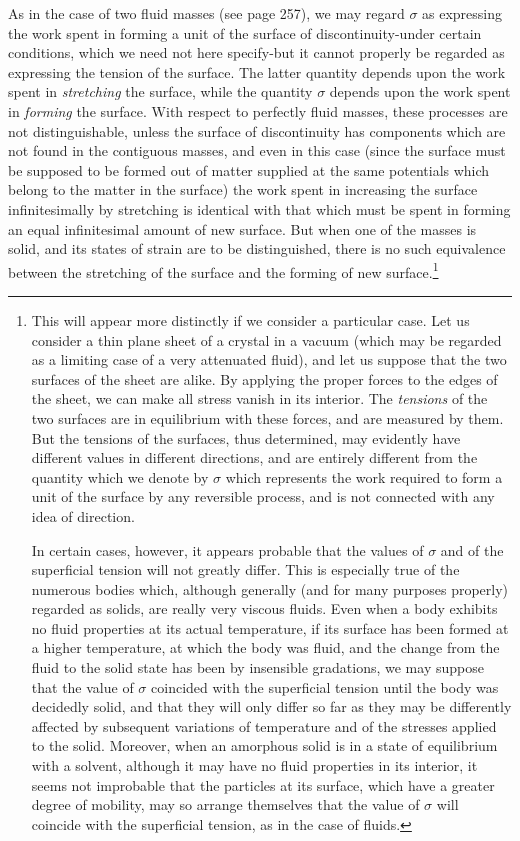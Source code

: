 \documentclass[12pt]{article}
\begin{document}
As in the case of two fluid masses (see page 257), we may regard $\sigma$ as expressing the work spent in forming a unit of the surface of discontinuity-under certain conditions, which we need not here specify-but it cannot properly be regarded as expressing the tension of the surface. The latter quantity depends upon the work spent in \textit{stretching} the surface, while the quantity $\sigma$ depends upon the work spent in \textit{forming} the surface. With respect to perfectly fluid masses, these processes are not distinguishable, unless the surface of discontinuity has components which are not found in the contiguous masses, and even in this case (since the surface must be supposed to be formed out of matter supplied at the same potentials which belong to the matter in the surface) the work spent in increasing the surface infinitesimally by stretching is identical with that which must be spent in forming an equal infinitesimal amount of new surface. But when one of the masses is solid, and its states of strain are to be distinguished, there is no such equivalence between the stretching of the surface and the forming of new surface.\footnote{This will appear more distinctly if we consider a particular case. Let us consider a thin plane sheet of a crystal in a vacuum (which may be regarded as a limiting case of a very attenuated fluid), and let us suppose that the two surfaces of the sheet are alike. By applying the proper forces to the edges of the sheet, we can make all stress vanish in its interior. The \textit{tensions} of the two surfaces are in equilibrium with these forces, and are measured by them. But the tensions of the surfaces, thus determined, may evidently have different values in different directions, and are entirely different from the quantity which we denote by $\sigma$ which represents the work required to form a unit of the surface by any reversible process, and is not connected with any idea of direction. \par
In certain cases, however, it appears probable that the values of $\sigma$ and of the superficial tension will not greatly differ. This is especially true of the numerous bodies which, although generally (and for many purposes properly) regarded as solids, are really very viscous fluids. Even when a body exhibits no fluid properties at its actual temperature, if its surface has been formed at a higher temperature, at which the body was fluid, and the change from the fluid to the solid state has been by insensible gradations, we may suppose that the value of $\sigma$ coincided with the superficial tension until the body was decidedly solid, and that they will only differ so far as they may be differently affected by subsequent variations of temperature and of the stresses applied to the solid. Moreover, when an amorphous solid is in a state of equilibrium with a solvent, although it may have no fluid properties in its interior, it seems not improbable that the particles at its surface, which have a greater degree of mobility, may so arrange themselves that the value of $\sigma$ will coincide with the superficial tension, as in the case of fluids.}
\end{document}
